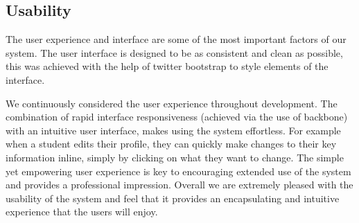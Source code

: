 \subsection{Usability}
The user experience and interface are some of the most important factors of our system. The user interface is designed to be as consistent and clean as possible, this was achieved with the help of twitter bootstrap to style elements of the interface.

We continuously considered the user experience throughout development. The combination of rapid interface responsiveness (achieved via the use of backbone) with an intuitive user interface, makes using the system effortless. For example when a student edits their profile, they can quickly make changes to their key information inline, simply by clicking on what they want to change. The simple yet empowering user experience is key to encouraging extended use of the system and provides a professional impression. Overall we are extremely pleased with the usability of the system and feel that it provides an encapsulating and intuitive experience that the users will enjoy.